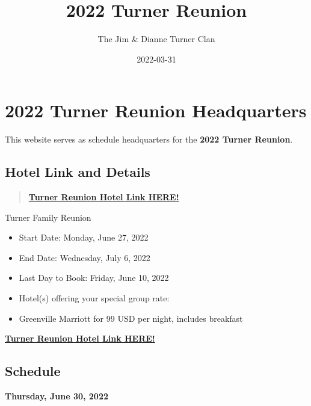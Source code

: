 \documentclass[
]{book}
\title{2022 Turner Reunion}
\author{The Jim \& Dianne Turner Clan}
\date{2022-03-31}
\providecommand{\tightlist}{%
  \setlength{\itemsep}{0pt}\setlength{\parskip}{0pt}}
\begin{document}
\maketitle

{
\setcounter{tocdepth}{1}
\tableofcontents
}
\hypertarget{turner-reunion-headquarters}{%
\chapter*{2022 Turner Reunion Headquarters}\label{turner-reunion-headquarters}}

This website serves as schedule headquarters for the \textbf{2022 Turner Reunion}.

\hypertarget{hotel-link-and-details}{%
\section*{Hotel Link and Details}\label{hotel-link-and-details}}

\begin{quote}
\textbf{\href{https://www.marriott.com/events/start.mi?id=1628261049761\&key=GRP}{Turner Reunion Hotel Link HERE!}}
\end{quote}

Turner Family Reunion

\begin{itemize}
\tightlist
\item
  Start Date: Monday, June 27, 2022
\item
  End Date: Wednesday, July 6, 2022
\item
  Last Day to Book: Friday, June 10, 2022
\item
  Hotel(s) offering your special group rate:
\item
  Greenville Marriott for 99 USD per night, includes breakfast
\end{itemize}

\textbf{\href{https://www.marriott.com/events/start.mi?id=1628261049761\&key=GRP}{Turner Reunion Hotel Link HERE!}}

\hypertarget{schedule}{%
\section*{Schedule}\label{schedule}}

\textbf{Thursday, June 30, 2022}
\end{document}
